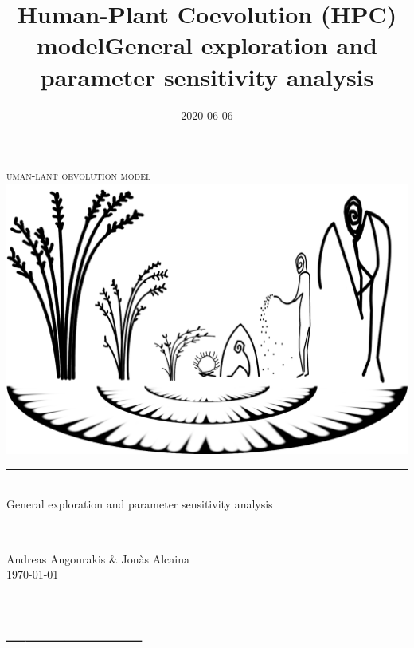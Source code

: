 \documentclass[
]{book}
\title{Human-Plant Coevolution (HPC) modelGeneral exploration and parameter sensitivity analysis}
\author{}
\date{\vspace{-2.5em}2020-06-06}
\begin{document}
\maketitle

\newcommand{\HRule}{\rule{\linewidth}{0.5mm}}


\begin{center}

\textsc{\LARGE
{}uman-lant oevolution model} 
\\[1cm]
\includegraphics[width=\textwidth]{images/hpcModel-logo_v2.png}
\\[1.5cm]
\HRule \\[0.4cm]
{ \huge General exploration and parameter sensitivity analysis \\[0.15cm] }
\HRule \\[1.5cm]
Andreas Angourakis \& Jon\`{a}s Alcaina
\\[1cm]
\today \\ [1cm]

\end{center}

\newpage
{}

{
\hypersetup{linkcolor=}
\setcounter{tocdepth}{1}
\tableofcontents
}
\hypertarget{section}{%
\chapter*{\_\_\_\_\_\_\_}\label{section}}
\end{document}
